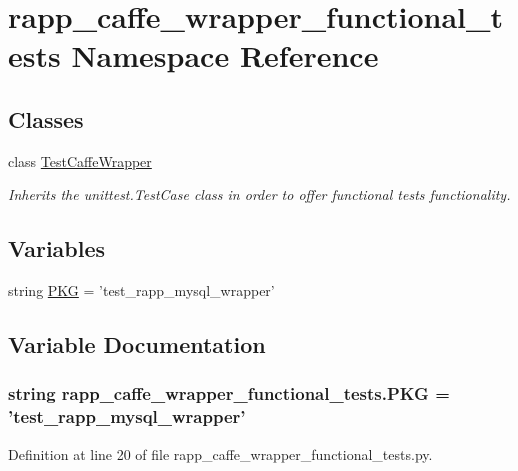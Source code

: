 \hypertarget{namespacerapp__caffe__wrapper__functional__tests}{\section{rapp\-\_\-caffe\-\_\-wrapper\-\_\-functional\-\_\-tests Namespace Reference}
\label{namespacerapp__caffe__wrapper__functional__tests}
}
\subsection*{Classes}
\begin{DoxyCompactItemize}
\item 
class \hyperlink{classrapp__caffe__wrapper__functional__tests_1_1TestCaffeWrapper}{Test\-Caffe\-Wrapper}
\begin{DoxyCompactList}\small\item\em Inherits the unittest.\-Test\-Case class in order to offer functional tests functionality. \end{DoxyCompactList}\end{DoxyCompactItemize}
\subsection*{Variables}
\begin{DoxyCompactItemize}
\item 
string \hyperlink{namespacerapp__caffe__wrapper__functional__tests_a8e76e592ba0ba86bbf4893a2ce5575d7}{P\-K\-G} = 'test\-\_\-rapp\-\_\-mysql\-\_\-wrapper'
\end{DoxyCompactItemize}


\subsection{Variable Documentation}
\hypertarget{namespacerapp__caffe__wrapper__functional__tests_a8e76e592ba0ba86bbf4893a2ce5575d7}{
\subsubsection[{P\-K\-G}]{\setlength{\rightskip}{0pt plus 5cm}string rapp\-\_\-caffe\-\_\-wrapper\-\_\-functional\-\_\-tests.\-P\-K\-G = 'test\-\_\-rapp\-\_\-mysql\-\_\-wrapper'}}\label{namespacerapp__caffe__wrapper__functional__tests_a8e76e592ba0ba86bbf4893a2ce5575d7}


Definition at line 20 of file rapp\-\_\-caffe\-\_\-wrapper\-\_\-functional\-\_\-tests.\-py.


